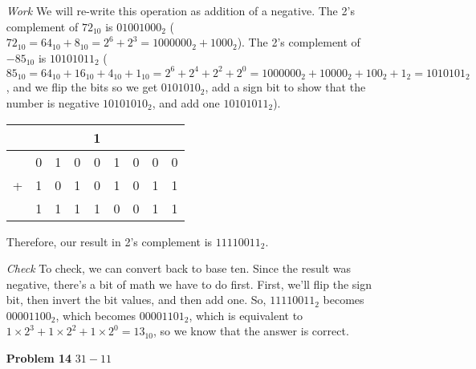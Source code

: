 \documentclass[12pt]{article}
\begin{document}
\begin{enumerate}
  \item[\textit{Work}] We will re-write this operation as addition of a negative. The 2's complement of $72_{10}$ is $01001000_2$ ($72_{10}=64_{10}+8_{10}=2^6+2^3=1000000_2+1000_2$). The 2's complement of $-85_{10}$ is $10101011_2$ ($85_{10}=64_{10}+16_{10}+4_{10}+1_{10}=2^6+2^4+2^2+2^0=1000000_2+10000_2+100_2+1_2=1010101_2$, and we flip the bits so we get $0101010_2$, add a sign bit to show that the number is negative $10101010_2$, and add one $10101011_2$).
  \item[]
  \begin{center}
    \begin{tabular}{c@{\,}c@{\,}c@{\,}c@{\,}c@{\,}c@{\,}c@{\,}c@{\,}c}
      &   &   &   & 1 &   &   &   &   \\    \hline
      & 0 & 1 & 0 & 0 & 1 & 0 & 0 & 0 \\
    + & 1 & 0 & 1 & 0 & 1 & 0 & 1 & 1 \\    \hline
      & 1 & 1 & 1 & 1 & 0 & 0 & 1 & 1
    \end{tabular}
  \end{center}
  \item[] Therefore, our result in 2's complement is $11110011_2$.
  \item[\textit{Check}] To check, we can convert back to base ten. Since the result was negative, there's a bit of math we have to do first. First, we'll flip the sign bit, then invert the bit values, and then add one. So, $11110011_2$ becomes $00001100_2$, which becomes $00001101_2$, which is equivalent to $1\times2^3+1\times2^2+1\times2^0=13_{10}$, so we know that the answer is correct.
\end{enumerate}


\begin{enumerate}
  \item[\textbf{Problem 14}] $31-11$
\end{enumerate}
\end{document}
